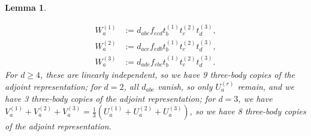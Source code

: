 \documentclass[10pt,twocolumn,superscriptaddress,aps,amsmath,amssymb,citeautoscript,floatfix,prx]{revtex4-2}
\theoremstyle{plain}
\theoremstyle{plain}
\theoremstyle{plain}
\theoremstyle{plain}
\theoremstyle{plain}
\theoremstyle{plain}
\theoremstyle{plain}
\newtheorem{smlemma}[smtheorem]{Lemma}
\theoremstyle{definition}
\theoremstyle{plain}
\begin{document}
\begin{appendix}
\begin{smlemma}
\begin{itemize}
\[            \begin{aligned}
            W_a^{(1)} & :=d_{a b e} f_{e c d} t_b^{(1)} t_c^{(2)} t_d^{(3)}, \\
            W_a^{(2)} & :=d_{a c e} f_{e d b} t_b^{(1)} t_c^{(2)} t_d^{(3)}, \\
            W_a^{(3)} & :=d_{a d e} f_{e b c} t_b^{(1)} t_c^{(2)} t_d^{(3)} .
            \end{aligned}
        \]
        For $d\geq 4$, these are linearly independent, so we have 9 three-body copies of the adjoint representation; for $d=2$, all $d_{a b e}$ vanish, so only $U_a^{(r)}$ remain, 
        and we have 3 three-body copies of the adjoint representation;
        for $d=3$, we have $V_a^{(1)}+V_a^{(2)}+V_a^{(3)}=\frac{1}{3}\left(U_a^{(1)}+U_a^{(2)}+U_a^{(3)}\right)$, so we have 8 three-body copies of the adjoint representation.
    \end{itemize}
\end{smlemma}


\end{appendix}
\end{document}
